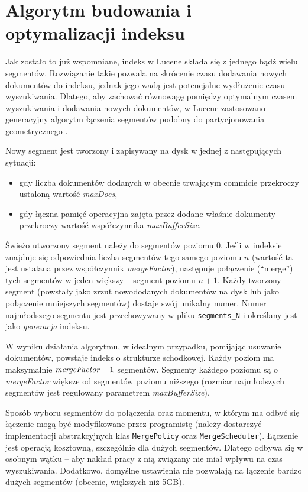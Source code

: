 \section{Algorytm budowania i optymalizacji indeksu}

Jak zostało to już wspomniane, indeks w Lucene składa się z jednego bądź wielu segmentów. Rozwiązanie takie pozwala na skrócenie czasu dodawania nowych dokumentów do indeksu, jednak jego wadą jest potencjalne wydłużenie czasu wyszukiwania. Dlatego, aby zachować równowagę pomiędzy optymalnym czasem wyszukiwania i dodawania nowych dokumentów, w Lucene zastosowano generacyjny algorytm łączenia segmentów podobny do partycjonowania geometrycznego \cite{geopart}. 

Nowy segment jest tworzony i zapisywany na dysk w jednej z następujących sytuacji:
\begin{itemize}
 \item gdy liczba dokumentów dodanych w obecnie trwającym commicie przekroczy ustaloną wartość \emph{maxDocs},
 \item gdy łączna pamięć operacyjna zajęta przez dodane właśnie dokumenty przekroczy wartość współczynnika \emph{maxBufferSize}.
\end{itemize}
Świeżo utworzony segment należy do segmentów poziomu 0. Jeśli w indeksie znajduje się odpowiednia liczba segmentów tego samego poziomu $n$ (wartość ta jest ustalana przez współczynnik \emph{mergeFactor}), następuje połączenie (``merge'') tych segmentów w jeden większy -- segment poziomu $n+1$. Każdy tworzony segment (powstały jako zrzut nowododanych dokumentów na dysk lub jako połączenie mniejszych segmentów) dostaje swój unikalny numer. Numer najmłodszego segmentu jest przechowywany w pliku \texttt{segments\_N} i określany jest jako \emph{generacja} indeksu.

W wyniku działania algorytmu, w idealnym przypadku, pomijając usuwanie dokumentów, powstaje indeks o strukturze schodkowej. Każdy poziom ma maksymalnie $\emph{mergeFactor} - 1$ segmentów. Segmenty każdego poziomu są o \emph{mergeFactor} większe od segmentów poziomu niższego (rozmiar najmłodszych segmentów jest regulowany parametrem \emph{maxBufferSize}).

Sposób wyboru segmentów do połączenia oraz momentu, w którym ma odbyć się łączenie mogą być modyfikowane przez programistę (należy dostarczyć implementacji abstrakcyjnych klas \texttt{MergePolicy} oraz \texttt{MergeScheduler}). Łączenie jest operacją kosztowną, szczególnie dla dużych segmentów. Dlatego odbywa się w osobnym wątku -- aby nakład pracy z nią związany nie miał wpływu na czas wyszukiwania. Dodatkowo, domyślne ustawienia nie pozwalają na łączenie bardzo dużych segmentów (obecnie, większych niż 5GB).
